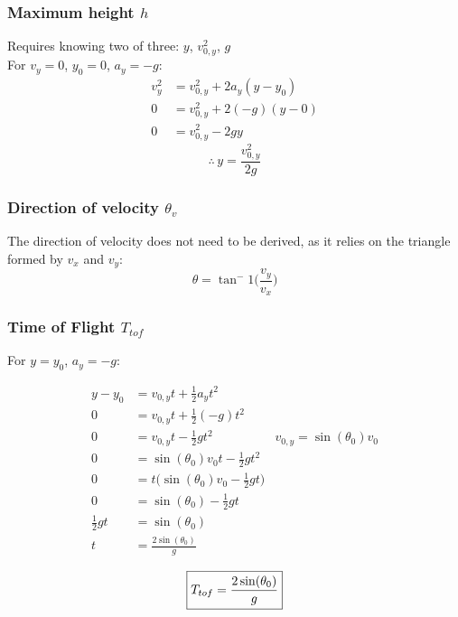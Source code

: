 \documentclass{article}
\numberwithin{equation}{section}
\begin{document}
 \subsubsection{Maximum height $h$}
 Requires knowing two of three: $y$, $v_{0,y}^2$, $g$\\
 For $v_{y}=0$, $y_{0}=0$, $a_{y} = -g$:
\[
  \begin{aligned}
    v_{y}^2 &= v_{0,y}^2 + 2a_{y}(y - y_{0}) \\
    0 &= v_{0,y}^2 + 2(-g)(y - 0) \\
    0 &= v_{0,y}^2 - 2gy
  \end{aligned}
\]
\begin{equation}\label{eq:projh}
  \therefore \, \boxed{y = \frac{v_{0,y}^2}{2g}}
\end{equation}

 \subsubsection{Direction of velocity $\theta_v$}
 The direction of velocity does not need to be derived, as it relies on the
 triangle formed by $v_x$ and $v_y$:
 \begin{equation}\label{eq:launchangle}
    \theta = \tan^-1 \bigg( \frac{v_y}{v_x} \bigg)
 \end{equation}
 \subsubsection{Time of Flight $T_{tof}$}
 For $y=y_{0}$, $a_{y} = -g$:
 
\[
  \begin{aligned}
    y - y_{0} &= v_{0,y}t + \frac{1}{2}a_{y}t^2 \\
    0 &= v_{0,y}t + \frac{1}{2}(-g)t^2 \\
    0 &= v_{0,y}t - \frac{1}{2}gt^2 & v_{0,y} = \sin(\theta_{0})v_{0}\\
    0 &= \sin(\theta_0)v_{0}t -\frac{1}{2}gt^2 \\
    0 &= t \bigg( \sin(\theta_0)v_{0} -\frac{1}{2}gt \bigg) \\
    0 &= \sin(\theta_{0}) - \frac{1}{2}gt \\
    \frac{1}{2}gt &= \sin(\theta_{0}) \\
    t &= \frac{2\sin(\theta_{0})}{g} \\
  \end{aligned}
\]
\begin{equation}\label{eq:tof}
   \boxed{    T_{tof} = \frac{2\sin(\theta_{0})}{g} \\}
 \end{equation}
\end{document}

